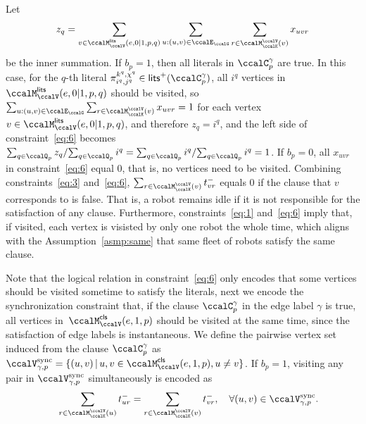 \documentclass[Afour,sageh,times]{sagej}
\renewcommand{\ap}[3]{\mathcal{\pi}_{{#1},{#2}}^{#3}}
\begin{document}
{{{Let $$z_{q} = \sum_{v \in \ccalM^\mathsf{lits}_{\ccalV}(e,0|1,p,q)} \sum_{u: (u,v) \in \ccalE_\ccalG} \sum_{r\in \ccalM^\ccalV_{\ccalK}(v)} x_{uvr}$$ be the inner summation. If $b_p=1$, then all literals in $\ccalC_p^{\gamma}$ are true. In this case, for the $q$-th literal $\ap{i^q}{j^q}{k^q,\chi^q} \in \mathsf{lits}^+(\ccalC_p^\gamma)$, all $i^q$ vertices in ${\ccalM^\mathsf{lits}_{\ccalV}(e,0|1,p,q)}$ should be visited, so $\sum_{u: (u,v) \in \ccalE_\ccalG} \sum_{r\in \ccalM^\ccalV_{\ccalK}(v)} x_{uvr} = 1$ for each vertex $v \in {\ccalM^\mathsf{lits}_{\ccalV}(e,0|1,p,q)}$, and therefore $z_{q}= i^q$, and the left side of constraint~\eqref{eq:6} becomes $ \sum_{q\in \ccalQ_p} z_q/ {\sum_{q\in \ccalQ_p} i^q} = {\sum_{q\in \ccalQ_p} i^q}/{\sum_{q\in \ccalQ_p} i^q} = 1 $. If $b_p=0$, all $x_{uvr}$ in constraint~\eqref{eq:6} equal 0, that is, no vertices need to be visited. Combining constraints~\eqref{eq:3} and~\eqref{eq:6}, $\sum_{r\in \ccalM^\ccalV_{\ccalK}(v)} t^-_{vr}$ equals 0 if the  clause that $v$ corresponds to is false. That is, a robot remains idle if it is not responsible for the satisfaction of any clause. Furthermore, constraints~\eqref{eq:1} and~\eqref{eq:6} imply that, if visited, each vertex is visisted by only one robot the whole time, which aligns with the Assumption~\ref{asmp:same} that same fleet of robots satisfy the same clause.

    Note that the logical relation in constraint~\eqref{eq:6} only encodes that some vertices should be visited sometime to satisfy the literals, next we encode the synchronization constraint that, if the clause $\ccalC_p^\gamma$ in the edge label $\gamma$ is true, all vertices in~$\ccalM^\mathsf{cls}_\ccalV(e, 1,p)$ should be visited at the same time, since the satisfaction of edge labels is instantaneous.
      We define the pairwise vertex set induced from the clause $\ccalC_p^\gamma$ as  $\ccalV_{\gamma, p}^{\text{sync}} = \{(u,v)\,|\, u, v\in \ccalM^\mathsf{cls}_\ccalV(e,1,p), u\not= v \}$. If $b_p=1$, visiting any pair in $\ccalV_{\gamma, p}^{\text{sync}}$ simultaneously is encoded as
\begingroup\makeatletter\def\f@size{10}\check@mathfonts
\def\maketag@@@#1{\hbox{\m@th\normalsize\normalfont#1}}%
\begin{align}
  & \quad\quad  \sum_{r\in \ccalM^\ccalV_{\ccalK}(u)} t_{ur}^-  = \sum_{r\in \ccalM^\ccalV_{\ccalK}(v)} t_{vr}^- , \quad\forall (u,v) \in \ccalV_{\gamma, p}^{\text{sync}}.\label{eq:7}
\end{align}
\endgroup





}}}
\end{document}
